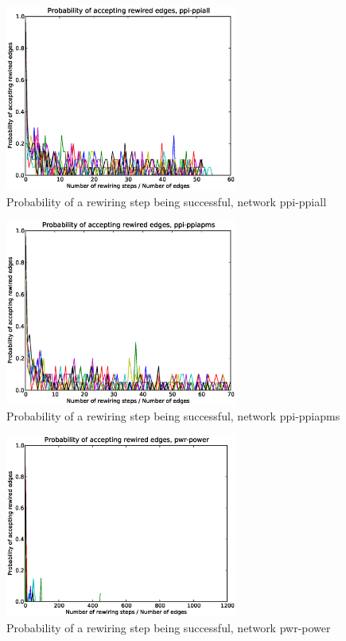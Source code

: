 \begin{figure}[p]
\centering
\includegraphics[width=3in]{Figures/Paccept-ppi-ppiall.eps}
\caption{Probability of a rewiring step being successful, network ppi-ppiall}
\label{fig:Paccept-ppi-ppiall}
\end{figure}

\begin{figure}[p]
\centering
\includegraphics[width=3in]{Figures/Paccept-ppi-ppiapms.eps}
\caption{Probability of a rewiring step being successful, network ppi-ppiapms}
\label{fig:Paccept-ppi-ppiapms}
\end{figure}

\begin{figure}[p]
\centering
\includegraphics[width=3in]{Figures/Paccept-pwr-power.eps}
\caption{Probability of a rewiring step being successful, network pwr-power}
\label{fig:Paccept-pwr-power}
\end{figure}
